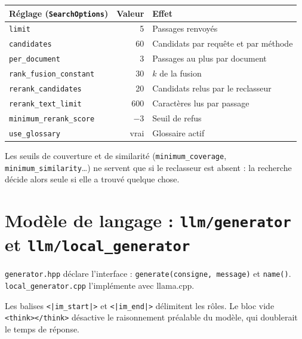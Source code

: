\documentclass[11pt,a4paper]{article}
\newcommand{\fichier}[1]{\texttt{#1}}
\begin{document}
\begin{center}
\small
\begin{tabularx}{\linewidth}{@{}l r X@{}}
\toprule
Réglage (\texttt{SearchOptions}) & Valeur & Effet \\
\midrule
\texttt{limit} & 5 & Passages renvoyés \\
\texttt{candidates} & 60 & Candidats par requête et par méthode \\
\texttt{per\_document} & 3 & Passages au plus par document \\
\texttt{rank\_fusion\_constant} & 30 & \(k\) de la fusion \\
\texttt{rerank\_candidates} & 20 & Candidats relus par le reclasseur \\
\texttt{rerank\_text\_limit} & 600 & Caractères lus par passage \\
\texttt{minimum\_rerank\_score} & \(-3\) & Seuil de refus \\
\texttt{use\_glossary} & vrai & Glossaire actif \\
\bottomrule
\end{tabularx}
\end{center}

Les seuils de couverture et de similarité (\texttt{minimum\_coverage}, \texttt{minimum\_similarity}\dots) ne servent que si le reclasseur est absent : la recherche décide alors seule si elle a trouvé quelque chose.

\section{Modèle de langage : \texttt{llm/generator} et \texttt{llm/local\_generator}}

\fichier{generator.hpp} déclare l'interface : \texttt{generate(consigne, message)} et \texttt{name()}. \fichier{local\_generator.cpp} l'implémente avec llama.cpp.



Les balises \texttt{<|im\_start|>} et \texttt{<|im\_end|>} délimitent les rôles. Le bloc vide \texttt{<think></think>} désactive le raisonnement préalable du modèle, qui doublerait le temps de réponse.


\end{document}
